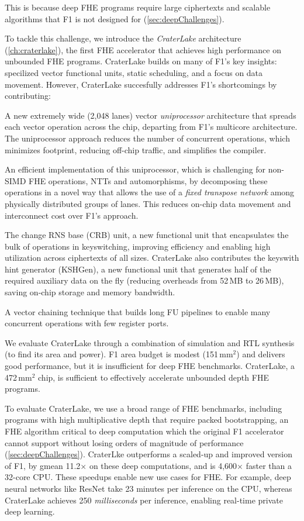 This is because deep FHE programs require large ciphertexts and scalable
algorithms that F1 is not designed for (\autoref{sec:deepChallenges}).

To tackle this challenge, we introduce the \emph{CraterLake} architecture
(\autoref{ch:craterlake}), the first FHE accelerator
that achieves high performance on unbounded FHE programs. CraterLake builds on
many of F1's key insights: specilized vector functional units, static
scheduling, and a focus on data movement. However, CraterLake succesfully
addresses F1's shortcomings by contributing:
\begin{compactitem}
\item A new extremely wide (2,048 lanes) vector \emph{uniprocessor}
    architecture that spreads each vector operation across the chip, departing
    from F1's multicore architecture. The uniprocessor approach reduces the
    number of concurrent operations, which minimizes footprint, reducing
    off-chip traffic, and simplifies the compiler.
\item An efficient implementation of this uniprocessor, which is
    challenging for non-SIMD FHE operations, NTTs and automorphisms, by
    decomposing these operations in a novel way that allows the use of a
    \emph{fixed transpose network} among physically distributed groups of
    lanes. This reduces on-chip data movement and interconnect cost over F1's
    approach.
\item The change RNS base (CRB) unit, a new functional unit that encapsulates
    the bulk of operations in keyswitching, improving efficiency and
    enabling high utilization across ciphertexts of all sizes. CraterLake also
    contributes the keyswith hint generator (KSHGen), a new functional unit
    that generates half of the required auxiliary data on the fly (reducing
    overheads from 52\,MB to 26\,MB), saving on-chip storage and memory
    bandwidth.
\item A vector chaining technique that builds long FU pipelines to enable many
    concurrent operations with few register ports.
\end{compactitem}

We evaluate CraterLake through a combination of simulation and RTL synthesis
(to find its area and power). F1 area budget is modest (151\,mm$^2$) and
delivers good performance, but it is insufficient for deep FHE benchmarks.
CraterLake, a 472\,mm$^2$ chip, is sufficient to effectively accelerate
unbounded depth FHE programs.

To evaluate CraterLake, we use a broad range of FHE benchmarks, including
programs with high multiplicative depth that require packed bootstrapping, an
FHE algorithm critical to deep computation which the original F1 accelerator
cannot support without losing orders of magnitude of performance
(\autoref{sec:deepChallenges}). CraterLke outperforms a scaled-up and improved
version of F1, by gmean 11.2$\times$ on these deep computations, and is
4,600$\times$ faster than a 32-core CPU. These speedups enable new use cases
for FHE. For example, deep neural networks like ResNet take 23 minutes per
inference on the CPU, whereas CraterLake achieves 250 \emph{milliseconds} per
inference, enabling real-time private deep learning.
